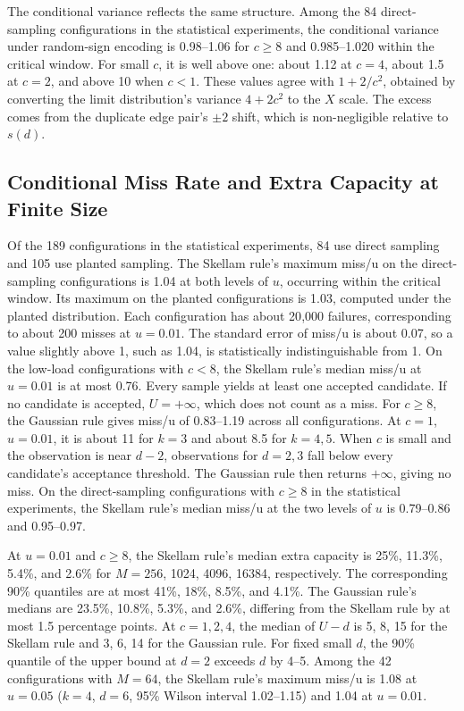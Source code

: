 The conditional variance reflects the same structure. Among the 84 direct-sampling configurations in the statistical experiments, the conditional variance under random-sign encoding is 0.98--1.06 for $c\ge8$ and 0.985--1.020 within the critical window. For small $c$, it is well above one: about 1.12 at $c=4$, about 1.5 at $c=2$, and above 10 when $c<1$. These values agree with $1+2/c^2$, obtained by converting the limit distribution's variance $4+2c^2$ to the $X$ scale. The excess comes from the duplicate edge pair's $\pm2$ shift, which is non-negligible relative to $s(d)$.

\subsection{Conditional Miss Rate and Extra Capacity at Finite Size}\label{app:cover-more}
Of the 189 configurations in the statistical experiments, 84 use direct sampling and 105 use planted sampling. The Skellam rule's maximum miss/u on the direct-sampling configurations is 1.04 at both levels of $u$, occurring within the critical window. Its maximum on the planted configurations is 1.03, computed under the planted distribution. Each configuration has about 20{,}000 failures, corresponding to about 200 misses at $u=0.01$. The standard error of miss/u is about 0.07, so a value slightly above 1, such as 1.04, is statistically indistinguishable from 1. On the low-load configurations with $c<8$, the Skellam rule's median miss/u at $u=0.01$ is at most 0.76. Every sample yields at least one accepted candidate. If no candidate is accepted, $U=+\infty$, which does not count as a miss. For $c\ge8$, the Gaussian rule gives miss/u of 0.83--1.19 across all configurations. At $c=1$, $u=0.01$, it is about 11 for $k=3$ and about 8.5 for $k=4,5$. When $c$ is small and the observation is near $d-2$, observations for $d=2,3$ fall below every candidate's acceptance threshold. The Gaussian rule then returns $+\infty$, giving no miss. On the direct-sampling configurations with $c\ge8$ in the statistical experiments, the Skellam rule's median miss/u at the two levels of $u$ is 0.79--0.86 and 0.95--0.97.

At $u=0.01$ and $c\ge8$, the Skellam rule's median extra capacity is 25\%, 11.3\%, 5.4\%, and 2.6\% for $M=256$, 1024, 4096, 16384, respectively. The corresponding 90\% quantiles are at most 41\%, 18\%, 8.5\%, and 4.1\%. The Gaussian rule's medians are 23.5\%, 10.8\%, 5.3\%, and 2.6\%, differing from the Skellam rule by at most 1.5 percentage points. At $c=1,2,4$, the median of $U-d$ is 5, 8, 15 for the Skellam rule and 3, 6, 14 for the Gaussian rule. For fixed small $d$, the 90\% quantile of the upper bound at $d=2$ exceeds $d$ by 4--5. Among the 42 configurations with $M=64$, the Skellam rule's maximum miss/u is 1.08 at $u=0.05$ ($k=4$, $d=6$, 95\% Wilson interval 1.02--1.15) and 1.04 at $u=0.01$.

